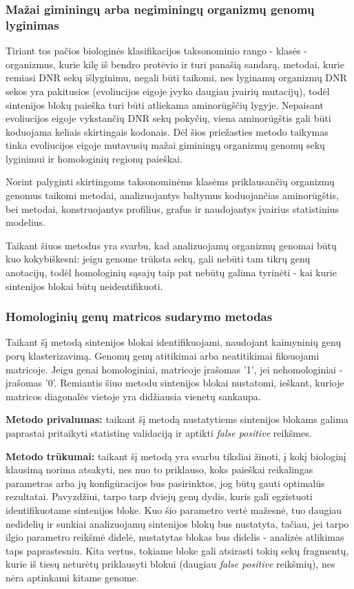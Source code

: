 \documentclass[12pt]{article}
\begin{document}
\subsubsection{Mažai giminingų arba negiminingų organizmų genomų lyginimas}
Tiriant tos pačios biologinės klasifikacijos taksonominio rango - klasės -
organizmus, kurie kilę iš bendro protėvio ir turi panašią sandarą, metodai, 
kurie remiasi DNR sekų išlyginimu, negali būti taikomi, nes lyginamų organizmų
DNR sekos yra pakitusios (evoliucijos eigoje įvyko daugiau įvairių mutacijų),
todėl sintenijos blokų paieška turi būti atliekama aminorūgščių lygyje.
Nepaisant evoliucijos eigoje vykstančių DNR sekų pokyčių, viena aminorūgštis
gali būti koduojama keliais skirtingais kodonais. Dėl šios priežasties metodo
taikymas tinka evoliucijos eigoje mutavusių mažai giminingų organizmų genomų
sekų lyginimui ir homologinių regionų paieškai.

Norint palyginti skirtingoms taksonominėms klasėms priklausančių organizmų
genomus taikomi metodai, analizuojantys baltymus koduojančias aminorūgštis,
bei metodai, konstruojantys profilius, grafus ir naudojantys įvairius
statistinius modelius.

Taikant šiuos metodus yra svarbu, kad analizuojamų organizmų genomai būtų kuo
kokybiškesni: jeigu genome trūksta sekų, gali nebūti tam tikrų genų anotacijų,
todėl homologinių sąsajų taip pat nebūtų galima tyrinėti - kai kurie sintenijos
blokai būtų neidentifikuoti.

\subsubsection*{Homologinių genų matricos sudarymo metodas}
Taikant šį metodą sintenijos blokai identifikuojami, naudojant kaimyninių genų
porų klasterizavimą. Genomų genų atitikimai arba neatitikimai fiksuojami
matricoje. Jeigu genai homologiniai, matricoje įrašomas '1', jei nehomologiniai
- įrašomas '0'. Remiantis šiuo metodu sintenijos blokai nustatomi, ieškant,
kurioje matricos diagonalės vietoje yra didžiausia vienetų sankaupa.

\textbf{Metodo privalumas:} taikant šį metodą nustatytiems sintenijos blokams
galima paprastai pritaikyti statistinę validaciją ir aptikti
\emph{false positive} reikšmes.

\textbf{Metodo trūkumai:} taikant šį metodą yra svarbu tiksliai žinoti, į kokį
biologinį klausimą norima atsakyti, nes nuo to priklauso, koks paieškai
reikalingas parametras arba jų konfigūracijos bus pasirinktos, jog būtų gauti
optimalūs rezultatai. Pavyzdžiui, tarpo tarp dviejų genų dydis, kuris gali
egzistuoti identifikuotame sintenijos bloke. Kuo šio parametro vertė mažesnė,
tuo daugiau nedidelių ir sunkiai analizuojamų sintenijos blokų bus nustatyta,
tačiau, jei tarpo ilgio parametro reikšmė didelė, nustatytas blokas bus didelis
- analizės atlikimas taps paprastesniu. Kita vertus, tokiame bloke gali
atsirasti tokių sekų fragmentų, kurie iš tiesų neturėtų priklausyti blokui
(daugiau \emph{false positive} reikšmių), nes nėra aptinkami kitame genome.
\end{document}
